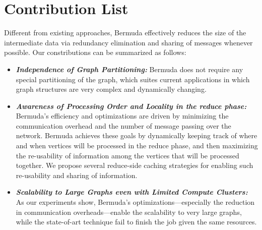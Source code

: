 \section{Contribution List}
Different from existing approaches, Bermuda effectively reduces the size of the intermediate data via redundancy elimination and sharing of messages whenever possible. Our constributions can be summarized as follows:
\begin{itemize}
\item {\em{\textbf{Independence of Graph Partitioning:}}}	Bermuda does not require any special partitioning of the graph, which suites current applications in which graph structures are very complex and dynamically changing.  
\item {\em{\textbf{Awareness of Processing Order and Locality in the reduce phase:}}} Bermuda's efficiency and optimizations are driven by minimizing the communication overhead and the number of message passing over the network. Bermuda achieves these goals by dynamically keeping track of where and when vertices will be processed in the 
reduce phase, and then maximizing the re-usability of information among the vertices that will be processed together. We propose  several reduce-side caching strategies for enabling such re-usability and sharing of information.
\item {\em{\textbf{Scalability to Large Graphs even with Limited Compute Clusters:}}} 
	As our experiments show, Bermuda's optimizations---especially the reduction in communication overheads---enable 
	the scalability to very large graphs, while the state-of-art technique fail to finish the job given the same resources.
\end{itemize}